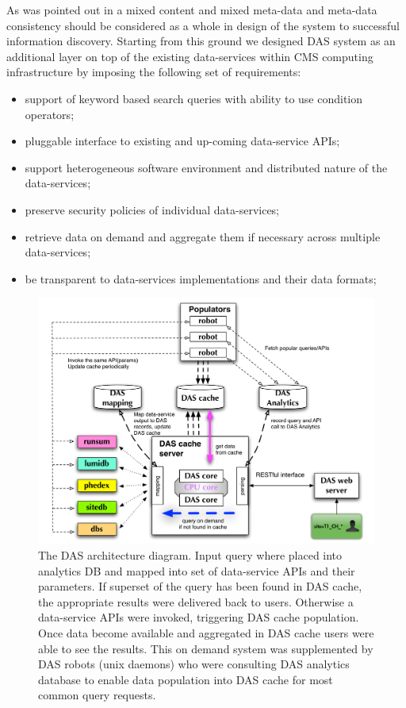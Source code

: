 \documentclass[a4paper]{jpconf}
\begin{document}
As was pointed out in \cite{Arms} a mixed content and 
mixed meta-data and meta-data consistency should be considered as a whole in design 
of the system to successful information discovery. 
Starting from this ground we designed DAS system as an
additional layer on top of the existing data-services
within CMS computing infrastructure by imposing the following set of requirements:
\begin{itemize}
\item support of keyword based search queries with ability to use condition operators;
\item pluggable interface to existing and up-coming data-service APIs;
\item support heterogeneous software environment and distributed nature of the data-services;
\item preserve security policies of individual data-services;
\item retrieve data on demand and aggregate them if necessary across
multiple data-services;
\item be transparent to data-services implementations and their data formats;
\end{itemize}
\begin{figure}[htb]
\centering
\includegraphics[width=120mm]{DAS_Cache_and_Analytics.pdf}
\caption{
The DAS architecture diagram. 
Input query where placed into analytics DB and mapped into set of
data-service APIs and their parameters. If superset of the query has been
found in DAS cache, the appropriate results were delivered back to users.
Otherwise a data-service APIs were invoked, triggering DAS cache population. 
Once data become available and aggregated in DAS cache users were able 
to see the results. This on demand system was supplemented by DAS robots 
(unix daemons) who were consulting DAS analytics database to enable data 
population into DAS cache for most common query requests.
}
\label{DAS_cache}
\end{figure}
\end{document}
